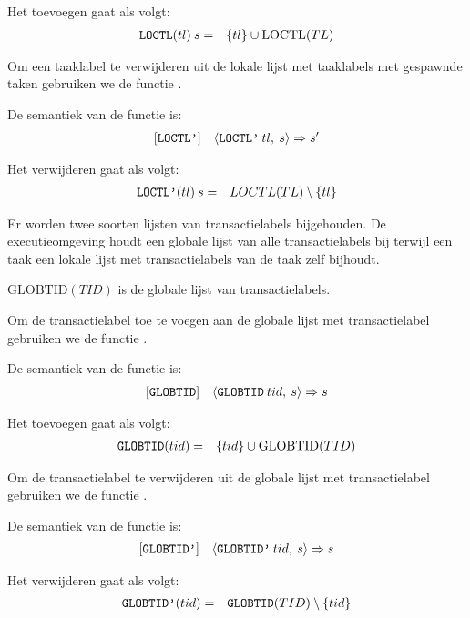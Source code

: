 Het toevoegen gaat als volgt:
\begin{eqnarray*}
	\textnormal{\texttt{LOCTL}}(tl)\:s &=& \{tl\}\cup\mathrm{LOCTL}(TL) \\
\end{eqnarray*}

Om een taaklabel te verwijderen uit de lokale lijst met taaklabels met gespawnde taken gebruiken we de functie
.

De semantiek van de functie is:
\begin{eqnarray*}
\left[\textnormal{\texttt{LOCTL'}}\right]&&
\langle\textnormal{\texttt{LOCTL'}}\:tl,\:s\rangle => s'\\
\end{eqnarray*}

Het verwijderen gaat als volgt:
\begin{eqnarray*}
	\textnormal{\texttt{LOCTL'}}(tl)\:s &=& {LOCTL}(TL) \setminus \{tl\} \\
\end{eqnarray*}


Er worden twee soorten lijsten van transactielabels bijgehouden. De executieomgeving houdt een globale lijst van
alle transactielabels bij terwijl een taak een lokale lijst met transactielabels van de taak zelf bijhoudt.

\(\mathrm{GLOBTID}(TID)\) is de globale lijst van transactielabels.

Om de transactielabel toe te voegen aan de globale lijst met transactielabel gebruiken we de functie .

De semantiek van de functie is:
\begin{eqnarray*}
\left[\textnormal{\texttt{GLOBTID}}\right]&&
\langle\textnormal{\texttt{GLOBTID}}\:tid,\:s\rangle => s
\end{eqnarray*}

Het toevoegen gaat als volgt:
\begin{eqnarray*}
	\textnormal{\texttt{GLOBTID}}(tid) &=& \{tid\}\cup\mathrm{GLOBTID}(TID) \\
\end{eqnarray*}

Om de transactielabel te verwijderen uit de globale lijst met transactielabel gebruiken we de functie
.

De semantiek van de functie is:
\begin{eqnarray*}
\left[\textnormal{\texttt{GLOBTID'}}\right]&&
\langle\textnormal{\texttt{GLOBTID'}}\:tid,\:s\rangle => s
\end{eqnarray*}

Het verwijderen gaat als volgt:
\begin{eqnarray*}
	\textnormal{\texttt{GLOBTID'}}(tid) &=& \textnormal{\texttt{GLOBTID}}(TID) \setminus \{tid\} \\
\end{eqnarray*}


